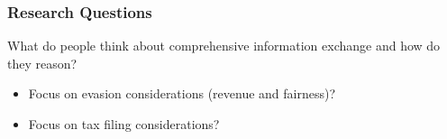 \documentclass{beamer}
\begin{document}
\begin{frame}
\frametitle{Research Questions}
\vspace{1em}
\alert{What do people think} about comprehensive information exchange and \alert{how do they reason}?
\vspace{1em}
\begin{itemize}
    \item Focus on evasion considerations (revenue and fairness)?\\[0.2em]
    \item Focus on tax filing considerations?
\end{itemize}
\end{frame}

\end{document}
